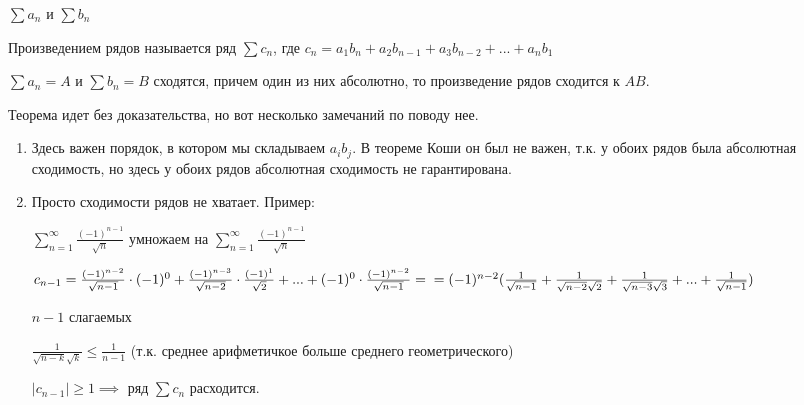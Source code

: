 \begin{definition} \thmslashn
	
	$\sum a_n$ и $\sum b_n$ 
	
	Произведением рядов называется ряд $\sum c_n$, где $c_n = a_1b_n+a_2b_{n-1}+a_3b_{n-2}+...+a_nb_1$
\end{definition}

\begin{theorem}[Мертенса] \thmslashn
	
	$\sum a_n = A$ и $\sum b_n = B$ сходятся, причем один из них абсолютно, то произведение рядов сходится к $AB$.
\end{theorem}

\begin{remark} \thmslashn
	
	Теорема идет без доказательства, но вот несколько замечаний по поводу нее.
	
	\begin{enumerate}
		\item Здесь важен порядок, в котором мы складываем $a_ib_j$. В теореме Коши он был не важен, т.к. у обоих рядов была абсолютная сходимость, но здесь у обоих рядов абсолютная сходимость не гарантирована.
		
		\item Просто сходимости рядов не хватает. Пример:
		
		$\sum\limits_{n = 1}^{\infty}\frac{(-1)^{n-1}}{\sqrt{n}}$ умножаем на $\sum\limits_{n = 1}^{\infty}\frac{(-1)^{n-1}}{\sqrt{n}}$
		
		$c_{n-1} = \frac{(-1)^{n-2}}{\sqrt{n-1}} \cdot (-1)^0 + \frac{(-1)^{n-3}}{\sqrt{n-2}} \cdot \frac{(-1)^1}{\sqrt{2}}+...  +(-1)^0 \cdot \frac{(-1)^{n-2}}{\sqrt{n-1}}=\\=
		(-1)^{n-2}(\frac{1}{\sqrt{n-1}} + \frac{1}{\sqrt{n-2}\sqrt{2}} +\frac{1}{\sqrt{n-3}\sqrt{3}} +...+\frac{1}{\sqrt{n-1}})$
		
		$n-1$ слагаемых
		
		$\frac{1}{\sqrt{n-k}\sqrt{k}} \le \frac{1}{n-1}$ (т.к. среднее арифметичкое больше среднего геометрического)
		
		$\left|c_{n-1}\right| \ge 1 \implies$ ряд $\sum c_n$ расходится.
	\end{enumerate}
\end{remark}